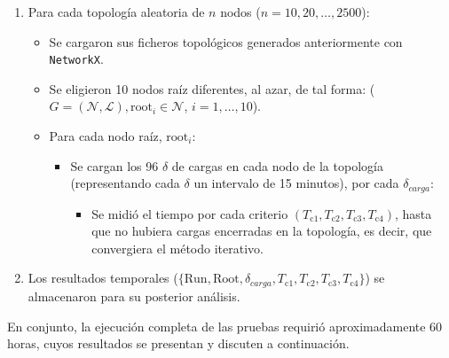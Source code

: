 \begin{enumerate}
  \item Para cada topología aleatoria de \(n\) nodos (\(n = 10,20,\dots,2500\)):
    
    \begin{itemize}
      
      \item Se cargaron sus ficheros topológicos generados anteriormente con \texttt{NetworkX}.
      
      \item Se eligieron 10 nodos raíz diferentes, al azar, de tal forma: (\(G=(\mathcal{N}, \mathcal{L}) , \mathrm{root}_i\in \mathcal{N}\), \(i=1,\dots,10\)).
      
      \item Para cada nodo raíz, \(\mathrm{root}_i\):
      
        \begin{itemize}
          \item Se cargan los 96 $\delta$ de cargas en cada nodo de la topología (representando cada $\delta$ un intervalo de 15 minutos), por cada $\delta_{carga}$:

          \begin{itemize}

              \item Se midió el tiempo por cada criterio $(T_{\mathrm{c1}},T_{\mathrm{c2}},T_{\mathrm{c3}},T_{\mathrm{c4}})$, hasta que no hubiera cargas encerradas en la topología, es decir, que convergiera el método iterativo. 
           \end{itemize}
        \end{itemize}
    \end{itemize}
    
  \item Los resultados temporales (\(\{\mathrm{Run},\mathrm{Root},\delta_{carga},T_{\mathrm{c1}},T_{\mathrm{c2}},T_{\mathrm{c3}},T_{\mathrm{c4}}\}\)) se almacenaron para su posterior análisis. 

\end{enumerate}

En conjunto, la ejecución completa de las pruebas requirió aproximadamente 60 horas, cuyos resultados se presentan y discuten a continuación.

